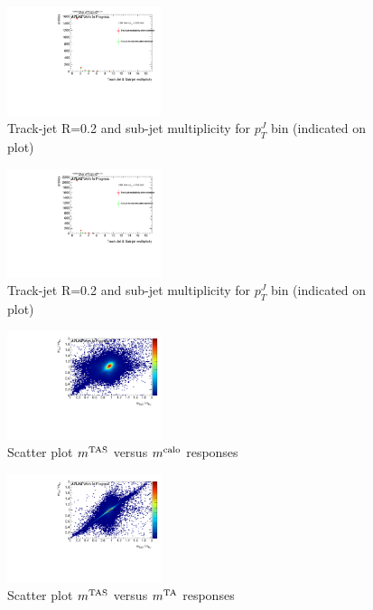 \begin{figure}

\includegraphics[width=0.4\textwidth]{appendixB/mTAS_W_calibmCal_20:07:01-03-11-2016/13cfrt_h_SubJet_aftersel_ptJ11TAmult.pdf}
\caption{Track-jet R=0.2 and sub-jet multiplicity for $p_{T}^{J}$ bin (indicated on plot) }

\end{figure}

\begin{figure}

\includegraphics[width=0.4\textwidth]{appendixB/mTAS_W_calibmCal_20:07:01-03-11-2016/13cfrt_h_SubJet_aftersel_ptJ12TAmult.pdf}
\caption{Track-jet R=0.2 and sub-jet multiplicity for $p_{T}^{J}$ bin (indicated on plot) }

\end{figure}

\clearpage

\begin{figure}

\includegraphics[width=0.4\textwidth]{appendixB/mTAS_W_calibmCal_20:07:01-03-11-2016/1cfrt_h_fabsca_tascal_2.pdf}
\caption{Scatter plot $m^\textrm{TAS}$ versus $m^\textrm{calo}$ responses}

\end{figure}
 
\begin{figure}
 
\includegraphics[width=0.4\textwidth]{appendixB/mTAS_W_calibmCal_20:07:01-03-11-2016/1cfrt_h_fabsca_tasta_2.pdf}
\caption{Scatter plot $m^\textrm{TAS}$ versus $m^\textrm{TA}$ responses}
 
\end{figure}
 
